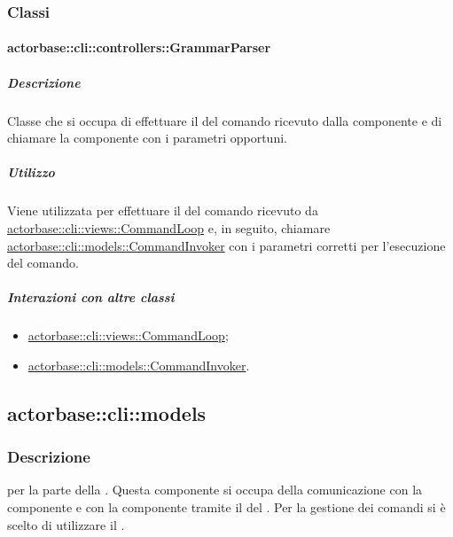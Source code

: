 \documentclass{scalatekids-article}
\begin{document}
\subsubsection{Classi}

\paragraph{actorbase::cli::controllers::GrammarParser}
\label{sec:actorbase::cli::controllers::GrammarParser}

\subparagraph{Descrizione}

Classe che si occupa di effettuare il  del comando ricevuto
dalla componente  e di chiamare la componente  con i
parametri opportuni.

\subparagraph{Utilizzo}

Viene utilizzata per effettuare il  del comando ricevuto da
\hyperref[sec:actorbase::cli::views::CommandLoop]{actorbase::cli::views::CommandLoop} e, in seguito, chiamare
\hyperref[sec:actorbase::cli::models::CommandInvoker]{actorbase::cli::models::CommandInvoker} con i parametri corretti per
l'esecuzione del comando.

\subparagraph{Interazioni con altre classi}

\begin{itemize}
\item \hyperref[sec:actorbase::cli::views::CommandLoop]{actorbase::cli::views::CommandLoop};
\item \hyperref[sec:actorbase::cli::models::CommandInvoker]{actorbase::cli::models::CommandInvoker}.
\end{itemize}

\subsection{actorbase::cli::models}
\label{sec:actorbase::cli::models}

\subsubsection{Descrizione}

 per la parte  della . Questa
componente si occupa della comunicazione con la componente  e
con la componente  tramite il  del  . Per la gestione dei comandi si è scelto di
utilizzare il .
\end{document}

